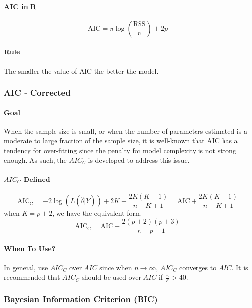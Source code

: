 \documentclass[10pt]{article}
\begin{document}
\paragraph{AIC in R}
\begin{equation*}
    \mathrm{AIC}=n \log \left(\frac{\mathrm{RSS}}{n}\right)+2 p
\end{equation*}
\paragraph{Rule} The smaller the value of AIC the better the model. 
\subsubsection{AIC - Corrected}
\paragraph{Goal} When the sample size is small, or when the number of parameters estimated is a moderate to large fraction of the sample size, it is well-known that AIC has a tendency for over-fitting since the penalty for model complexity is not strong enough. As such, the $AIC_C$ is developed to address this issue.


\paragraph{$AIC_C$ Defined}
\begin{equation*}
    \mathrm{AIC}_{\mathrm{C}}=-2 \log (L(\hat{\theta} | Y))+2 K+\frac{2 K(K+1)}{n-K+1}=\mathrm{AIC}+\frac{2 K(K+1)}{n-K+1}
\end{equation*}
when $K = p + 2$, we have the equivalent form
\begin{equation*}
    \mathrm{AIC}_{\mathrm{C}}=\mathrm{AIC}+\frac{2(p+2)(p+3)}{n-p-1}
\end{equation*}

\paragraph{When To Use?} In general, use $AIC_C$ over $AIC$ since when $n \to \infty$, $AIC_C$ converges to $AIC$. It is recommended that $AIC_C$ should be used over $AIC$ if $\frac{n}{K} > 40$. 

\subsubsection{Bayesian Information Criterion (BIC)}
\end{document}
